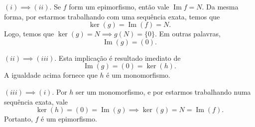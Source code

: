 \documentclass[11pt,twoside,a4paper]{article}
\DeclareMathOperator {\Imagem}{ Im }
\theoremstyle{remark}
\theoremstyle{definition}
\theoremstyle{plain}
\begin{document}
$(i) \implies (ii)$. Se $f$ form um epimorfismo, então vale $\Imagem{f} = N$. Da mesma forma, por estarmos
trabalhando com uma sequência exata, temos que
    \[\ker(g) = \Imagem(f) = N.\]
Logo, temos que $\ker(g) = N \implies g(N) = \{0\}$. Em outras palavras, 
    \[\Imagem(g) = (0). \]

$(ii) \implies (iii).$ Esta implicação é resultado imediato de
    \[ \Imagem(g) = (0) = \ker(h). \]
A igualdade acima fornece que $h$ é um monomorfismo.

$(iii) \implies (i)$. Por $h$ ser um monomorfismo, e por estarmos trabalhando numa sequência exata,
vale
    \[ \ker(h) = (0) = \Imagem(g) \implies \ker(g) = N = \Imagem(f).\]
Portanto, $f$ é um epimorfismo.
\end{document}
